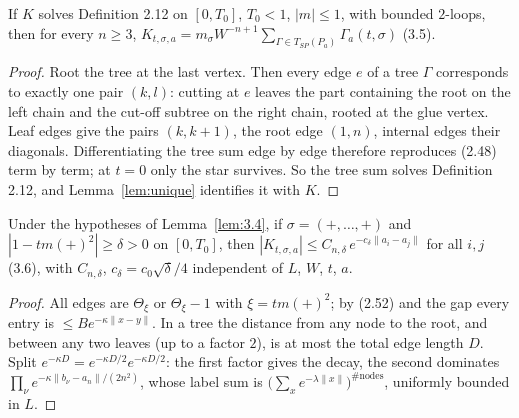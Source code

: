 \begin{lemma}\label{lem:3.4}
  \leanok
  If $K$ solves Definition 2.12 on $[0,T_0]$, $T_0<1$, $|m|\le1$, with bounded $2$-loops, then
  for every $n\ge3$,
  $K_{t,\sigma,a}=m_\sigma W^{-n+1}\sum_{\Gamma\in T_{SP}(P_a)}\Gamma_a(t,\sigma)$ (3.5).
\end{lemma}
\begin{proof}\leanok{}
  Root the tree at the last vertex.  Then every edge $e$ of a tree $\Gamma$ corresponds to
  exactly one pair $(k,l)$: cutting at $e$ leaves the part containing the root on the left
  chain and the cut-off subtree on the right chain, rooted at the glue vertex.  Leaf edges give
  the pairs $(k,k+1)$, the root edge $(1,n)$, internal edges their diagonals.  Differentiating
  the tree sum edge by edge therefore reproduces (2.48) term by term; at $t=0$ only the star
  survives.  So the tree sum solves Definition 2.12, and Lemma~\ref{lem:unique} identifies it
  with $K$.
\end{proof}

\begin{corollary}\label{cor:3.5}
  \leanok
  Under the hypotheses of Lemma~\ref{lem:3.4}, if $\sigma=(+,\dots,+)$ and
  $|1-tm(+)^2|\ge\delta>0$ on $[0,T_0]$, then
  $|K_{t,\sigma,a}|\le C_{n,\delta}\,e^{-c_\delta\|a_i-a_j\|}$ for all $i,j$ (3.6), with
  $C_{n,\delta}$, $c_\delta=c_0\sqrt\delta/4$ independent of $L$, $W$, $t$, $a$.
\end{corollary}
\begin{proof}\leanok{}
  All edges are $\Theta_\xi$ or $\Theta_\xi-1$ with $\xi=tm(+)^2$; by (2.52) and the gap every
  entry is $\le B e^{-\kappa\|x-y\|}$.  In a tree the distance from any node to the root, and
  between any two leaves (up to a factor $2$), is at most the total edge length $D$.  Split
  $e^{-\kappa D}=e^{-\kappa D/2}e^{-\kappa D/2}$: the first factor gives the decay, the second
  dominates $\prod_\nu e^{-\kappa\|b_\nu-a_n\|/(2n^2)}$, whose label sum is
  $\bigl(\sum_x e^{-\lambda\|x\|}\bigr)^{\#\text{nodes}}$, uniformly bounded in $L$.
\end{proof}

